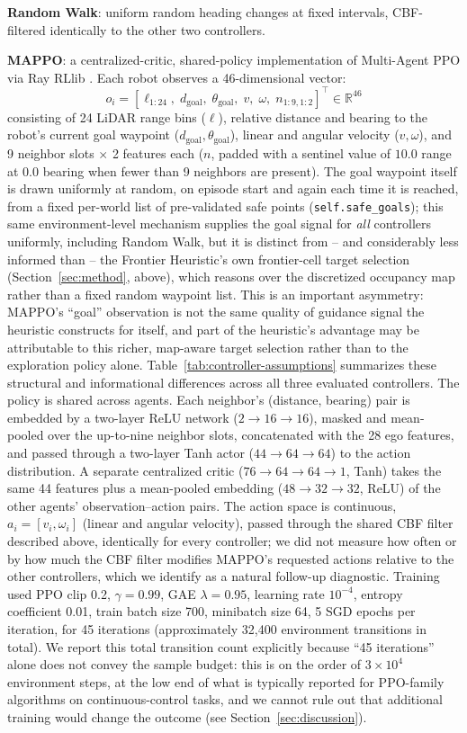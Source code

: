 \documentclass[11pt]{article}
\begin{document}
\noindent\textbf{Random Walk}: uniform random heading changes at fixed
intervals, CBF-filtered identically to the other two controllers.

\noindent\textbf{MAPPO}: a centralized-critic, shared-policy implementation of Multi-Agent PPO \cite{yu2022mappo, schulman2017ppo} via Ray RLlib \cite{rllib}. Each
robot observes a 46-dimensional vector:
\[
o_i = [\ell_{1:24},\; d_{\text{goal}},\; \theta_{\text{goal}},\; v,\; \omega,\; n_{1:9,1:2}]^\top \in \mathbb{R}^{46}
\]
consisting of 24 LiDAR range bins
($\ell$), relative distance and bearing to the robot's current goal
waypoint ($d_{\text{goal}}, \theta_{\text{goal}}$), linear and angular
velocity ($v, \omega$), and 9 neighbor slots $\times$ 2 features each
($n$, padded with a sentinel value of $10.0$ range at $0.0$ bearing when
fewer than 9 neighbors are present). The goal waypoint itself is drawn
uniformly at random, on episode start and again each time it is reached,
from a fixed per-world list of pre-validated safe points
(\texttt{self.safe\_goals}); this same environment-level mechanism
supplies the goal signal for \emph{all} controllers uniformly, including
Random Walk, but it is distinct from -- and considerably less informed
than -- the Frontier Heuristic's own frontier-cell target selection
(Section~\ref{sec:method}, above), which reasons over the discretized
occupancy map rather than a fixed random waypoint list. This is an
important asymmetry: MAPPO's ``goal'' observation is not the same
quality of guidance signal the heuristic constructs for itself, and part
of the heuristic's advantage may be attributable to this richer,
map-aware target selection rather than to the exploration policy alone.
Table~\ref{tab:controller-assumptions} summarizes these structural
and informational differences across all three evaluated controllers.
The policy is shared across agents. Each neighbor's (distance, bearing) pair
is embedded by a two-layer ReLU network ($2\to16\to16$), masked and
mean-pooled over the up-to-nine neighbor slots, concatenated with the 28
ego features, and passed through a two-layer Tanh actor ($44\to64\to64$)
to the action distribution. A separate centralized critic ($76\to64\to64\to1$,
Tanh) takes the same 44 features plus a mean-pooled embedding
($48\to32\to32$, ReLU) of the other agents' observation--action pairs. The action space is continuous, $a_i=[v_i,\omega_i]$ (linear and
angular velocity), passed through the shared CBF filter described above,
identically for every controller; we did not measure how often or by how
much the CBF filter modifies MAPPO's requested actions relative to the
other controllers, which we identify as a natural follow-up diagnostic.
Training
used PPO clip 0.2, $\gamma=0.99$, GAE $\lambda=0.95$, learning rate
$10^{-4}$, entropy coefficient 0.01, train batch size 700, minibatch size
64, 5 SGD epochs per iteration, for 45 iterations (approximately 32{,}400
environment transitions in total). We report this total transition count
explicitly because ``45 iterations'' alone does not convey the sample
budget: this is on the order of $3\times10^4$ environment steps, at the
low end of what is typically reported for PPO-family algorithms on
continuous-control tasks, and we cannot rule out that additional training
would change the outcome (see Section~\ref{sec:discussion}).
\end{document}
